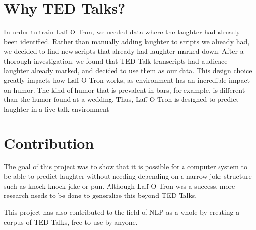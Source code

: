 \section{Why TED Talks?}
In order to train Laff-O-Tron, we needed data where the laughter had already been identified. Rather than manually adding laughter to scripts we already had, we decided to find new scripts that already had laughter marked down. After a thorough investigation, we found that TED Talk transcripts had audience laughter already marked, and decided to use them as our data. This design choice greatly impacts how Laff-O-Tron works, as environment has an incredible impact on humor. The kind of humor that is prevalent in bars, for example, is different than the humor found at a wedding. Thus, Laff-O-Tron is designed to predict laughter in a live talk environment. 


\section{Contribution}
The goal of this project was to show that it is possible for a computer system to be able to predict laughter without needing depending on a narrow joke structure such as knock knock joke or pun. Although Laff-O-Tron was a success, more research needs to be done to generalize this beyond TED Talks. 

This project has also contributed to the field of NLP as a whole by creating a corpus of TED Talks, free to use by anyone.
